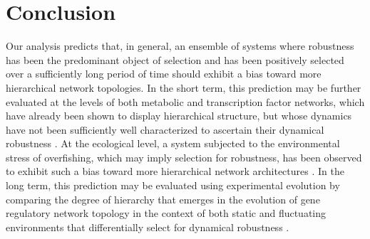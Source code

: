\section{Conclusion}
Our analysis predicts that, in general, an ensemble of systems where robustness has been the predominant object of selection and has been positively selected over a sufficiently long period of time should exhibit a bias toward more hierarchical network topologies. In the short term, this prediction may be further evaluated at the levels of both metabolic and transcription factor networks, which have already been shown to display hierarchical structure, but whose dynamics have not been sufficiently well characterized to ascertain their dynamical robustness \cite{Zhao2006,Bhardwaj2010,Colm}. At the ecological level, a system subjected to the environmental stress of overfishing, which may imply selection for robustness, has been observed to exhibit such a bias toward more hierarchical network architectures \cite{Bascompte2005}.
In the long term, this prediction may be evaluated using experimental evolution by comparing the degree of hierarchy that emerges in the evolution of gene regulatory network topology in the context of both static and fluctuating environments that differentially select for dynamical robustness \cite{Leroi1994}.

